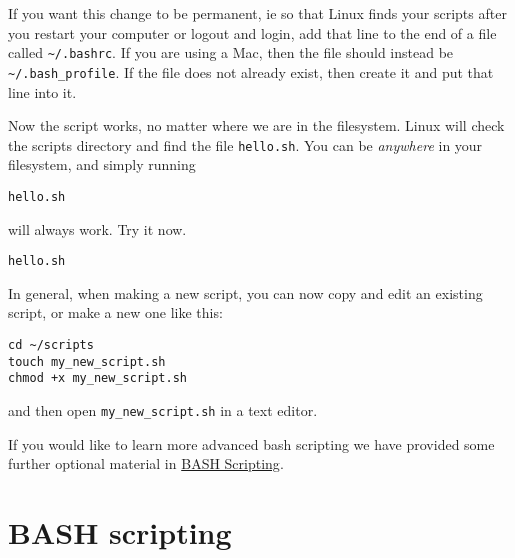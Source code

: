 \documentclass[11pt]{article}
\makeatletter
\newcommand{\boxspacing}{\kern\kvtcb@left@rule\kern\kvtcb@boxsep}
\newcommand{\prompt}[4]{
        {\ttfamily\llap{{\color{blue}\LARGE\faKeyboardO\hspace{3pt}#4}}\vspace{-\baselineskip}}
    }
\makeatother
\begin{document}
    If you want this change to be permanent, ie so that Linux finds your
scripts after you restart your computer or logout and login, add that
line to the end of a file called \texttt{\textasciitilde{}/.bashrc}. If
you are using a Mac, then the file should instead be
\texttt{\textasciitilde{}/.bash\_profile}. If the file does not already
exist, then create it and put that line into it.

    Now the script works, no matter where we are in the filesystem. Linux
will check the scripts directory and find the file \texttt{hello.sh}.
You can be \textit{anywhere} in your filesystem, and simply running

\begin{verbatim}
hello.sh
\end{verbatim}

will always work. Try it now.

    \begin{tcolorbox}[breakable, size=fbox, boxrule=1pt, pad at break*=1mm,colback=cellbackground, colframe=cellborder]
\prompt{In}{incolor}{ }{\boxspacing}
\begin{Verbatim}[commandchars=\\\{\}]
hello.sh
\end{Verbatim}
\end{tcolorbox}

    In general, when making a new script, you can now copy and edit an
existing script, or make a new one like this:

\begin{verbatim}
cd ~/scripts
touch my_new_script.sh
chmod +x my_new_script.sh
\end{verbatim}

and then open \texttt{my\_new\_script.sh} in a text editor.

    If you would like to learn more advanced bash scripting we have provided
some further optional material in \href{bash.ipynb}{BASH Scripting}.





\newpage





    \hypertarget{bash-scripting}{%
\section{BASH scripting}\label{bash-scripting}}
\end{document}

